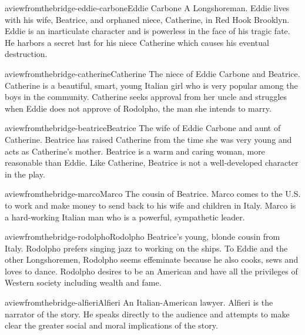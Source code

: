 \documentclass[preview]{standalone}
\begin{document}
\genpage

\begin{snippetcharacter}{aviewfromthebridge-eddie-carbone}{Eddie Carbone}
    A Longshoreman. Eddie lives with his wife, Beatrice,
    and orphaned niece, Catherine, in Red Hook Brooklyn.
    Eddie is an inarticulate character and is powerless in the face of his tragic fate.
    He harbors a secret lust for his niece Catherine which causes his eventual destruction.
\end{snippetcharacter}

\begin{snippetcharacter}{aviewfromthebridge-catherine}{Catherine}
    The niece of Eddie Carbone and Beatrice. Catherine is a beautiful, smart, young Italian girl who is very popular among the boys in the community. Catherine seeks approval from her uncle and struggles when Eddie does not approve of Rodolpho, the man she intends to marry.
\end{snippetcharacter}

\begin{snippetcharacter}{aviewfromthebridge-beatrice}{Beatrice}
    The wife of Eddie Carbone and aunt of Catherine. Beatrice has raised Catherine from the time she was very young and acts as Catherine's mother. Beatrice is a warm and caring woman, more reasonable than Eddie. Like Catherine, Beatrice is not a well-developed character in the play.
\end{snippetcharacter}

\begin{snippetcharacter}{aviewfromthebridge-marco}{Marco}
    The cousin of Beatrice. Marco comes to the U.S. to work and make money to send back to his wife and children in Italy. Marco is a hard-working Italian man who is a powerful, sympathetic leader.
\end{snippetcharacter}

\begin{snippetcharacter}{aviewfromthebridge-rodolpho}{Rodolpho}
    Beatrice's young, blonde cousin from Italy. Rodolpho prefers singing jazz to working on the ships. To Eddie and the other Longshoremen, Rodolpho seems effeminate because he also cooks, sews and loves to dance. Rodolpho desires to be an American and have all the privileges of Western society including wealth and fame.
\end{snippetcharacter}

\begin{snippetcharacter}{aviewfromthebridge-alfieri}{Alfieri}
    An Italian-American lawyer. Alfieri is the narrator of the story. He speaks directly to the audience and attempts to make clear the greater social and moral implications of the story.
\end{snippetcharacter}
\end{document}
